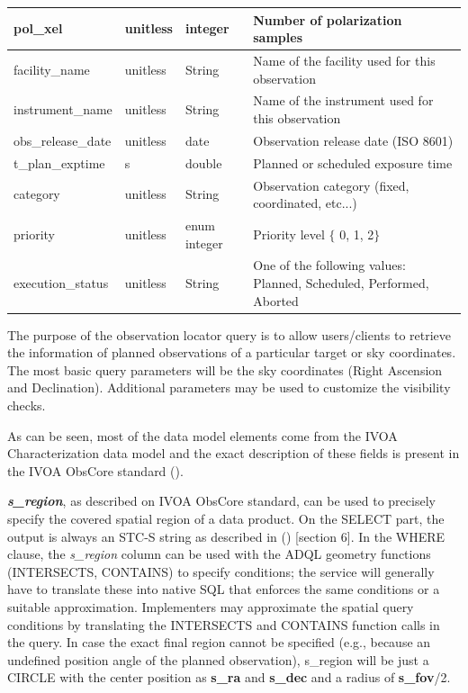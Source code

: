 \documentclass[11pt,a4paper]{ivoa}
\begin{document}
\begin{landscape}
\begin{table}
\begin{tabular}{ |l|l|l|l| }
\hline
pol\_xel & 
unitless & 
integer & 
Number of polarization samples \\
\hline
facility\_name & 
unitless & 
String & 
Name of the facility used for this observation \\
\hline
instrument\_name & 
unitless & 
String & 
Name of the instrument used for this observation \\
\hline
obs\_release\_date & 
unitless & 
date & 
Observation release date (ISO 8601) \\
\hline
t\_plan\_exptime & 
s & 
double & 
Planned or scheduled exposure time \\
\hline
category & 
unitless & 
String & 
Observation category (fixed, coordinated, etc...) \\
\hline
priority & 
unitless & 
enum integer & 
Priority level $ \{ $ 0, 1, 2$ \} $ \\
\hline
execution\_status & 
unitless & 
String & 
One of the following values:  Planned, Scheduled, Performed, Aborted \\
\hline
\end{tabular}
\end{table}
\end{landscape}


The purpose of the observation locator query is to allow users/clients to retrieve the 
information of planned observations of a particular target or sky coordinates. The most 
basic query parameters will be the sky coordinates (Right Ascension and Declination). 
Additional parameters may be used to customize the visibility checks.

As can be seen, most of the data model elements come from the IVOA Characterization 
data model and the exact description of these fields is present in the IVOA ObsCore 
standard (\cite{Lou17}).

\textbf{\textit{s\_region}}, as described on IVOA ObsCore standard, can be used to 
precisely specify the covered spatial region of a data product. On the SELECT part, 
the output is always an STC-S string as described in (\cite{TAP}) [section 6]. In the 
WHERE clause, the \textit{s\_region} column can be used with the ADQL geometry functions 
(INTERSECTS, CONTAINS) to specify conditions; the service will generally have to translate 
these into native SQL that enforces the same conditions or a suitable approximation. 
Implementers may approximate the spatial query conditions by translating the INTERSECTS 
and CONTAINS function calls in the query. In case the exact final region cannot be 
specified (e.g., because an undefined position angle of the planned observation), 
s\_region will be just a CIRCLE with the center position as \textbf{s\_ra} and \textbf{s\_dec} 
and a radius of \textbf{s\_fov}/2.
\end{document}
